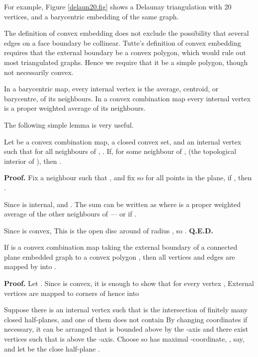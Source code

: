 For example, Figure \ref{delaun20.fig} shows a Delaunay triangulation
with 20 vertices, and a barycentric embedding of the same graph.

The definition of convex embedding does not exclude the
possibility that several edges on a face boundary be collinear.
Tutte's definition of convex embedding
\cite{tutte60} requires that the external boundary
be a convex polygon, which would rule out most triangulated
graphs.  Hence we require that it be a simple
polygon, though not necessarily convex.

In a barycentric map, every internal vertex is the average, centroid,
or barycentre, of its neighbours.  In a convex combination map
every internal vertex is a proper weighted average of its
neighbours.

The following simple lemma is very useful.

\begin{lemma}
\label{lem: one-sided}
Let  be a convex combination map,  a closed convex
set, and  an internal vertex such that
for all neighbours  of , .
If, for some neighbour  of ,  (the topological interior
of ), then .
\end{lemma}

{\bf Proof.} Fix a neighbour  such that ,
and fix  so for all points  in the
plane, if , then .

Since  is internal,
  and .
The sum can be written
as   where  is
a proper weighted average of the other neighbours of  --- or
 if .

Since  is convex,
 This is the open disc around  of
radius , so . {\bf Q.E.D.}\medskip

\begin{lemma}
\label{convex combination map inside P} If  is a convex combination map taking the external boundary
of a connected plane embedded graph  to a convex polygon ,
then all vertices and edges are mapped by  into .
\end{lemma}

{\bf Proof.}
Let .
Since  is convex, it is enough to show that for every
vertex ,   External vertices are mapped
to corners of  hence into 

Suppose there is an internal vertex  such that
   is the intersection of finitely many
closed half-planes, and one of them
does not contain   By changing coordinates if
necessary, it can be arranged that  is bounded above
by the -axis and there exist vertices 
such that  is above the -axis.
Choose  so  has maximal -coordinate, , say, and
let  be the close half-plane .

